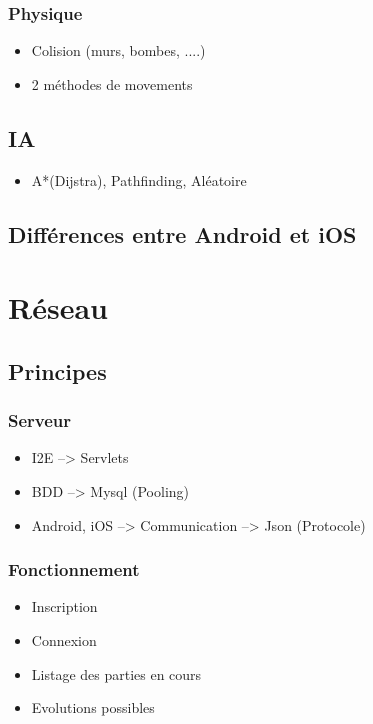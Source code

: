 \documentclass[]{report}
\begin{document}
		\subsection{Physique}
			\begin{itemize}
				\item{Colision (murs, bombes, ....)}
				\item{2 méthodes de movements}
			\end{itemize}
	\section{IA}
		\begin{itemize}
			\item{A*(Dijstra), Pathfinding, Aléatoire}
		\end{itemize}
		
	\section{Différences entre Android et iOS}
		
			
\chapter{Réseau}
	\section{Principes}
		\subsection{Serveur}
			\begin{itemize}
				\item{I2E --> Servlets}
				\item{BDD --> Mysql (Pooling)}
				\item{Android, iOS --> Communication --> Json (Protocole)}
			\end{itemize}
		\subsection{Fonctionnement}
			\begin{itemize}
				\item{Inscription}
				\item{Connexion}
				\item{Listage des parties en cours}
				\item{Evolutions possibles}
			\end{itemize}
\end{document}
